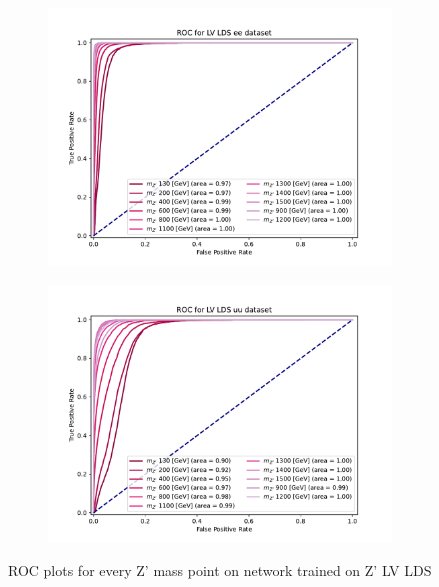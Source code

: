 \documentclass[12pt, a4paper]{book}
\begin{document}
\begin{figure}[!ht]
	\centering
	\begin{subfigure}[b]{0.49\textwidth}
      \centering
      \includegraphics[width=1\textwidth]{XGBoost/LV_LDS/ROC_ee.pdf}
      \end{subfigure}
   \hfill
   \begin{subfigure}[b]{0.49\textwidth}
      \centering
      \includegraphics[width=1\textwidth]{XGBoost/LV_LDS/ROC_uu.pdf}
      \end{subfigure}
   \caption{ROC plots for every Z' mass point on network trained on Z' LV LDS}\label{fig:LV_LDS_ROCS}
\end{figure}
\end{document}
